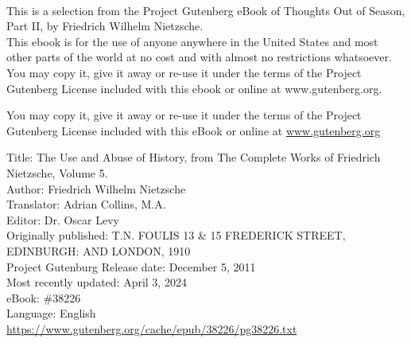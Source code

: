 \begin{titlepage}
    \,
    \vfill

        \begingroup
\scriptsize     
\noindent
This is a selection from the Project Gutenberg eBook of Thoughts Out of Season, Part II, by Friedrich Wilhelm Nietzsche.\\

\noindent    
This ebook is for the use of anyone anywhere in the United States and
most other parts of the world at no cost and with almost no restrictions
whatsoever. You may copy it, give it away or re-use it under the terms
of the Project Gutenberg License included with this ebook or online
at www.gutenberg.org. 

\noindent
You may copy it, give it away or
re-use it under the terms of the Project Gutenberg License included
with this eBook or online at \href{https://www.gutenberg.org}{www.gutenberg.org}
\endgroup

\vspace{0.5cm}

\begingroup
\scriptsize
\noindent
Title: The Use and Abuse of History, from The Complete Works of Friedrich Nietzsche, Volume 5.\\
Author: Friedrich Wilhelm Nietzsche\\
Translator: Adrian Collins, M.A.\\
Editor:  Dr. Oscar Levy\\
Originally published: T.N. FOULIS 13 \& 15 FREDERICK STREET, EDINBURGH: AND LONDON, 1910 \\
Project Gutenburg Release date: December 5, 2011 \\
Most recently updated: April 3, 2024\\
eBook: \#38226\\
Language: English\\
\url{https://www.gutenberg.org/cache/epub/38226/pg38226.txt}
\endgroup



\end{titlepage}